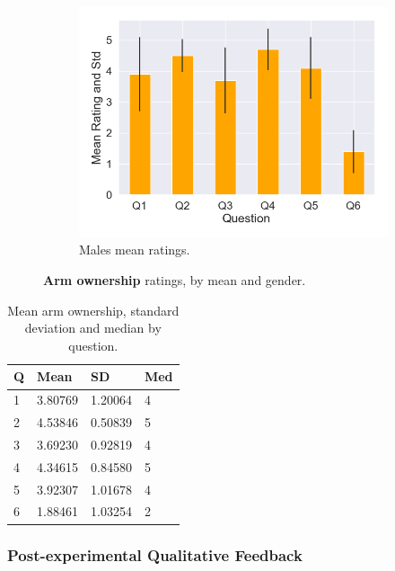 \begin{figure}[H]
  \hspace{10mm}
 \begin{subfigure}[b]{0.3\textwidth}
 \centering
 \includegraphics[scale=0.33]{Files/Plots/ownership_mean_ratings_m.png}
 \caption{Males mean ratings.}
 \label{fig:ownMale}
 \end{subfigure}
 \caption{\textbf{Arm ownership} ratings, by mean and gender.}
\label{fig:ownAll}
\end{figure}


\begin{table}
\begin{tabular}{|llll|}
\hline
Q & Mean & SD & Med \\
\hline
1 & 3.80769 & 1.20064& 4 \\  
2 & 4.53846 & 0.50839& 5\\  
3 & 3.69230 &  0.92819& 4\\  
4 & 4.34615 & 0.84580& 5\\  
5 & 3.92307 &  1.01678&4 \\  
6 & 1.88461 &  1.03254& 2\\  
\hline
\end{tabular}
\caption{Mean arm ownership, standard deviation and median by question.}
\label{tbl:own}
\end{table} 

\clearpage

\subsubsection{Post-experimental Qualitative Feedback}
\label{qualitativeFeedback}


